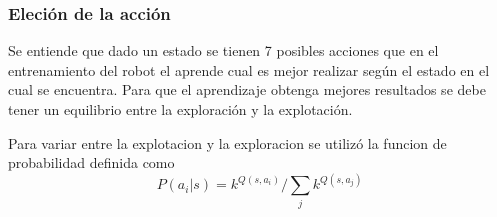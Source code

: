 \subsubsection{Eleci\'on de la acci\'on}


Se entiende que dado un estado se tienen 7 posibles acciones que en el entrenamiento del robot el aprende cual es mejor realizar según el estado en el cual se encuentra. Para que el aprendizaje obtenga mejores resultados se debe tener un equilibrio entre la exploración y la explotación. 

Para variar entre la explotacion y la exploracion se utiliz\'o la funcion de probabilidad definida como  \[P(a_{i} | s) = k^{Q(s,a_{i})}/ \sum_{j}k^{Q(s,a_{j})}  \] 
 
 
 
 
 
